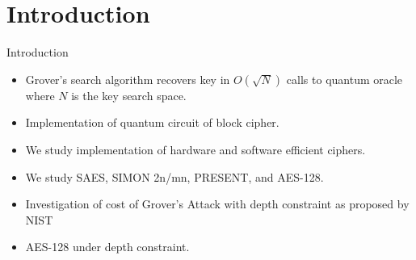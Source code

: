 \section{Introduction}

\begin{frame}{Introduction}
\begin{itemize}
    \item Grover's search algorithm recovers key in $O(\sqrt{N})$ calls to quantum oracle where $N$ is the key search space.
    \pause
    \item Implementation of quantum circuit of block cipher.
    \pause
    \item We study implementation of hardware and software efficient ciphers.
    \pause
    \item We study SAES, SIMON 2n/mn, PRESENT, and AES-128.
    \pause
    \item Investigation of cost of Grover's Attack with depth constraint as proposed by NIST
    \pause
    \item AES-128 under depth constraint.
\end{itemize}
\end{frame}